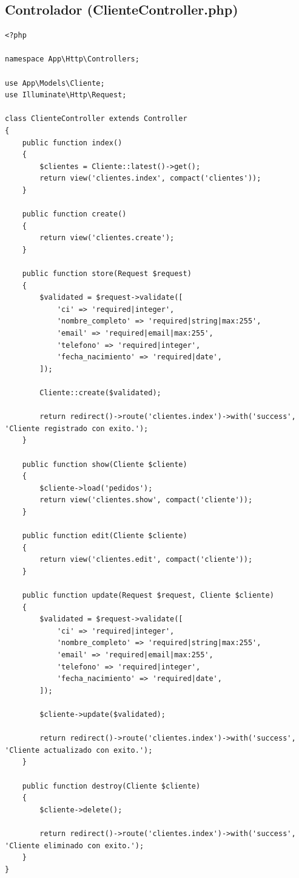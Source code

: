 \documentclass[12pt, letterpaper]{article}
\begin{document}
\subsection{Controlador (ClienteController.php)}
\begin{lstlisting}[language=purePHP]
<?php

namespace App\Http\Controllers;

use App\Models\Cliente;
use Illuminate\Http\Request;

class ClienteController extends Controller
{
    public function index()
    {
        $clientes = Cliente::latest()->get();
        return view('clientes.index', compact('clientes'));
    }

    public function create()
    {
        return view('clientes.create');
    }

    public function store(Request $request)
    {
        $validated = $request->validate([
            'ci' => 'required|integer',
            'nombre_completo' => 'required|string|max:255',
            'email' => 'required|email|max:255',
            'telefono' => 'required|integer',
            'fecha_nacimiento' => 'required|date',
        ]);

        Cliente::create($validated);

        return redirect()->route('clientes.index')->with('success', 'Cliente registrado con exito.');
    }

    public function show(Cliente $cliente)
    {
        $cliente->load('pedidos');
        return view('clientes.show', compact('cliente'));
    }

    public function edit(Cliente $cliente)
    {
        return view('clientes.edit', compact('cliente'));
    }

    public function update(Request $request, Cliente $cliente)
    {
        $validated = $request->validate([
            'ci' => 'required|integer',
            'nombre_completo' => 'required|string|max:255',
            'email' => 'required|email|max:255',
            'telefono' => 'required|integer',
            'fecha_nacimiento' => 'required|date',
        ]);

        $cliente->update($validated);

        return redirect()->route('clientes.index')->with('success', 'Cliente actualizado con exito.');
    }

    public function destroy(Cliente $cliente)
    {
        $cliente->delete();

        return redirect()->route('clientes.index')->with('success', 'Cliente eliminado con exito.');
    }
}
\end{lstlisting}
\end{document}
